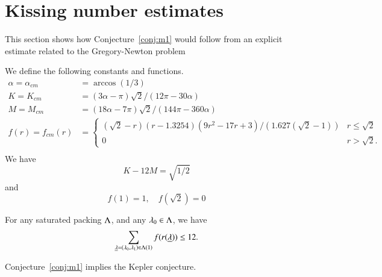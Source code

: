 \section{Kissing number estimates}

This section shows how Conjecture~\ref{conj:m1} would follow from an explicit estimate
related to the Gregory-Newton problem


We define the following constants and functions.
$$
\begin{array}{lll}
\alpha=\alpha_{cm} &= \arccos(1/3)\\
K=K_{cm} &= (3\alpha-\pi)\sqrt2/(12\pi - 30\alpha)\\
M = M_{cm} &= (18\alpha-7\pi)\sqrt2/(144\pi-360\alpha)\\
f(r) = f_{cm}(r) &=
\begin{cases}
 (\sqrt2-r) (r-1.3254) (9r^2 - 17 r + 3)/(1.627 (\sqrt2-1))& r\le\sqrt2\\
 0 & r >\sqrt2.
\end{cases}
\\
\end{array}
$$
We have 
\begin{equation}\label{eqn:km}K - 12M = \sqrt{1/2}\end{equation}
and
\begin{equation}f(1) = 1,\quad f(\sqrt2) =0\end{equation}


\begin{conjecture}[Marchal-2]\label{conj:m1} For any saturated packing $\Lambda$, and
any $\lambda_0\in\Lambda$, we have
$$
\sum_{{\underline{\lambda}}=(\lambda_0,\lambda_1)\in\Lambda(1)} f(r({\underline{\lambda}})) \le 12.
$$
\end{conjecture}

\begin{theorem}\label{theorem:mk}
Conjecture~\ref{conj:m1} implies the Kepler conjecture.
\end{theorem}

